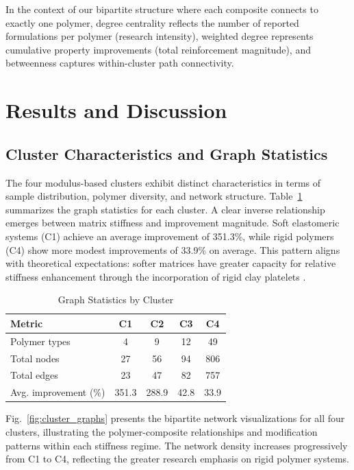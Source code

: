 \documentclass[conference]{IEEEtran}
\begin{document}
In the context of our bipartite structure where each composite connects to exactly one polymer, degree centrality reflects the number of reported formulations per polymer (research intensity), weighted degree represents cumulative property improvements (total reinforcement magnitude), and betweenness captures within-cluster path connectivity.

\section{Results and Discussion}

\subsection{Cluster Characteristics and Graph Statistics}

The four modulus-based clusters exhibit distinct characteristics in terms of sample distribution, polymer diversity, and network structure. Table~\ref{tab:graph_stats} summarizes the graph statistics for each cluster. A clear inverse relationship emerges between matrix stiffness and improvement magnitude. Soft elastomeric systems (C1) achieve an average improvement of 351.3\%, while rigid polymers (C4) show more modest improvements of 33.9\% on average. This pattern aligns with theoretical expectations: softer matrices have greater capacity for relative stiffness enhancement through the incorporation of rigid clay platelets \cite{11, 14}.

\begin{table}[htbp]
\caption{Graph Statistics by Cluster}
\begin{center}
\begin{tabular}{@{}lcccc@{}}
\toprule
Metric & C1 & C2 & C3 & C4 \\
\midrule
Polymer types & 4 & 9 & 12 & 49 \\
Total nodes & 27 & 56 & 94 & 806 \\
Total edges & 23 & 47 & 82 & 757 \\
Avg. improvement (\%) & 351.3 & 288.9 & 42.8 & 33.9 \\
\bottomrule
\end{tabular}
\label{tab:graph_stats}
\end{center}
\end{table}

Fig.~\ref{fig:cluster_graphs} presents the bipartite network visualizations for all four clusters, illustrating the polymer-composite relationships and modification patterns within each stiffness regime. The network density increases progressively from C1 to C4, reflecting the greater research emphasis on rigid polymer systems.
\end{document}
